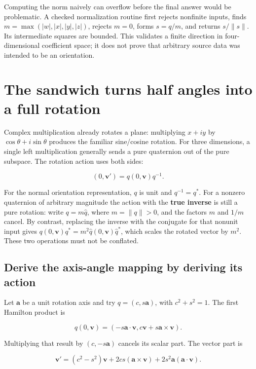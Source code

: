 Computing the norm naively can overflow before the final answer would be problematic. A checked normalization routine first rejects nonfinite inputs, finds \(m=\max(|w|,|x|,|y|,|z|)\), rejects \(m=0\), forms \(s=q/m\), and returns \(s/\|s\|\). Its intermediate squares are bounded. This validates a finite direction in four-dimensional coefficient space; it does not prove that arbitrary source data was intended to be an orientation.

\section{The sandwich turns half angles into a full rotation}\label{01-foundations-i-ch019-the-sandwich-turns-half-angles-into-a-full-rotation}

Complex multiplication already rotates a plane: multiplying \(x+iy\) by \(\cos\theta+i\sin\theta\) produces the familiar sine/cosine rotation. For three dimensions, a single left multiplication generally sends a pure quaternion out of the pure subspace. The rotation action uses both sides:

\[
(0,\mathbf v')=q(0,\mathbf v)q^{-1}.
\]

For the normal orientation representation, \(q\) is unit and \(q^{-1}=q^*\). For a nonzero quaternion of arbitrary magnitude the action with the \textbf{true inverse} is still a pure rotation: write \(q=m\widehat q\), where \(m=\|q\|>0\), and the factors \(m\) and \(1/m\) cancel. By contrast, replacing the inverse with the conjugate for that nonunit input gives \(q(0,\mathbf v)q^*=m^2\widehat q(0,\mathbf v)\widehat q^*\), which scales the rotated vector by \(m^2\). These two operations must not be conflated.

\subsection{Derive the axis-angle mapping by deriving its action}\label{01-foundations-i-ch019-derive-the-axis-angle-mapping-by-deriving-its-action}

Let \(\mathbf a\) be a unit rotation axis and try \(q=(c,s\mathbf a)\), with \(c^2+s^2=1\). The first Hamilton product is

\[
q(0,\mathbf v)=
\left(-s\mathbf a\cdot\mathbf v,
c\mathbf v+s\mathbf a\times\mathbf v\right).
\]

Multiplying that result by \((c,-s\mathbf a)\) cancels its scalar part. The vector part is

\[
\mathbf v'=(c^2-s^2)\mathbf v
+2cs(\mathbf a\times\mathbf v)
+2s^2\mathbf a(\mathbf a\cdot\mathbf v).
\]

